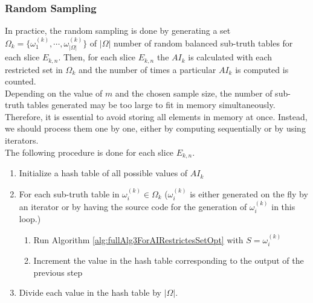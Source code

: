 \documentclass[11pt]{llncs}
\begin{document}

\subsubsection{Random Sampling}
In practice, the random sampling is done by generating a set $\Omega_k = \{\omega_1^{(k)}, \cdots, \omega_{|\Omega|}^{(k)}\}$ of $|\Omega|$ number of random balanced sub-truth tables for each slice $E_{k,n}$. Then, for each slice $E_{k,n}$ the $AI_k$ is calculated with each restricted set in $\Omega_k$ and the number of times a particular $AI_k$ is computed is counted.\\
Depending on the value of $m$ and the chosen sample size, the number of sub-truth tables generated may be too large to fit in memory simultaneously. Therefore, it is essential to avoid storing all elements in memory at once. Instead, we should process them one by one, either by computing sequentially or by using iterators.\\ 

The following procedure is done for each slice $E_{k,n}$.
\begin{enumerate}
    \item Initialize a hash table of all possible values of $AI_k$
    \item For each sub-truth table in $\omega_i^{(k)} \in \Omega_k$ ($\omega_i^{(k)}$ is either generated on the fly by an iterator or by having the source code for the generation of $\omega_i^{(k)}$ in this loop.)
    \begin{enumerate}
        \item Run Algorithm \ref{alg:fullAlg3ForAIRestrictesSetOpt} with $S=\omega_i^{(k)}$\label{enum:stepOfapplicationEnum}\\
        \item Increment the value in the hash table corresponding to the output of the previous step
    \end{enumerate}
    \item Divide each value in the hash table by $|\Omega|$.
\end{enumerate}
\end{document}

